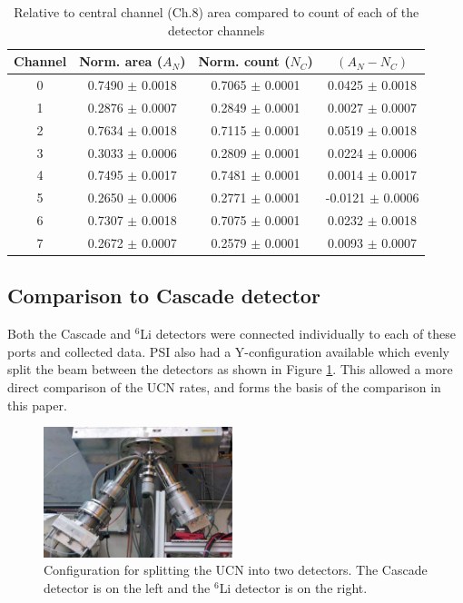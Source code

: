 \documentclass[letter,twocolumn,preprint,3p,numbers,sort&compress]{elsarticle}
\begin{document}
\begin{table}[ht]
  \caption{Relative to central channel (Ch.8) area compared to count of each of the detector channels}
  \centering
  \begin{tabular}{c | c c | c}
    \hline \hline
 Channel  & Norm. area ($A_N$)  & Norm. count ($N_C$)  &     $( A_N - N_C )$ \\    
    \hline 
    0  &      0.7490 $\pm$   0.0018   &    0.7065 $\pm$   0.0001    &        0.0425 $\pm$   0.0018\\
    1  &      0.2876 $\pm$   0.0007   &    0.2849 $\pm$   0.0001    &        0.0027 $\pm$   0.0007\\
    2  &      0.7634 $\pm$   0.0018   &    0.7115 $\pm$   0.0001    &        0.0519 $\pm$   0.0018\\
    3  &      0.3033 $\pm$   0.0006   &    0.2809 $\pm$   0.0001    &        0.0224 $\pm$   0.0006\\
    4  &      0.7495 $\pm$   0.0017   &    0.7481 $\pm$   0.0001    &        0.0014 $\pm$   0.0017\\
    5  &      0.2650 $\pm$   0.0006   &    0.2771 $\pm$   0.0001    &       -0.0121 $\pm$   0.0006\\
    6  &      0.7307 $\pm$   0.0018   &    0.7075 $\pm$   0.0001    &        0.0232 $\pm$   0.0018\\
    7  &      0.2672 $\pm$   0.0007   &    0.2579 $\pm$   0.0001    &        0.0093 $\pm$   0.0007\\
    \hline
  \end{tabular}
\label{tab:relrates}
\end{table}





\subsection{ Comparison to Cascade detector }

Both the Cascade and $^6$Li detectors were connected individually to
each of these ports and collected data.  PSI also had a
Y-configuration available which evenly split the beam between the
detectors as shown in Figure \ref{fig:yConfig}.  This allowed a more
direct comparison of the UCN rates, and forms the basis of the
comparison in this paper.

\begin{figure}[!htpb] 
\centering \includegraphics[width=0.49\textwidth]{figures/yConfig.pdf}
\caption{Configuration for splitting the UCN into two detectors.  The
  Cascade detector is on the left and the $^6$Li detector is on the
  right.}
\label{fig:yConfig}
\end{figure}
\end{document}
